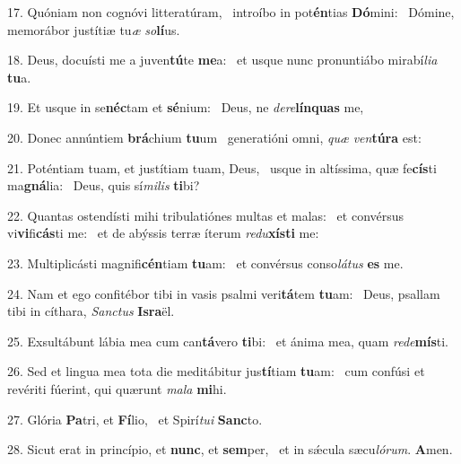 17. Quóniam non cognóvi litteratúram, \dag\  introíbo in pot\textbf{én}tias \textbf{Dó}mini: \ast\  Dómine, memorábor justítiæ tu\textit{æ} \textit{so}\textbf{lí}us.\

18. Deus, docuísti me a juven\textbf{tú}te \textbf{me}a: \ast\  et usque nunc pronuntiábo mirabí\textit{li}\textit{a} \textbf{tu}a.\

19. Et usque in se\textbf{néc}tam et \textbf{sé}nium: \ast\  Deus, ne \textit{de}\textit{re}\textbf{lín}\textbf{quas} me,\

20. Donec annúntiem \textbf{brá}chium \textbf{tu}um \ast\  generatióni omni, \textit{quæ} \textit{ven}\textbf{tú}\textbf{ra} est:\

21. Poténtiam tuam, et justítiam tuam, Deus, \dag\  usque in altíssima, quæ fe\textbf{cís}ti ma\textbf{gná}lia: \ast\  Deus, quis sí\textit{mi}\textit{lis} \textbf{ti}bi?\

22. Quantas ostendísti mihi tribulatiónes multas et malas: \dag\  et convérsus vi\textbf{vi}fi\textbf{cás}ti me: \ast\  et de abýssis terræ íterum \textit{re}\textit{du}\textbf{xís}\textbf{ti} me:\

23. Multiplicásti magnifi\textbf{cén}tiam \textbf{tu}am: \ast\  et convérsus conso\textit{lá}\textit{tus} \textbf{es} me.\

24. Nam et ego confitébor tibi in vasis psalmi veri\textbf{tá}tem \textbf{tu}am: \ast\  Deus, psallam tibi in cíthara, \textit{Sanc}\textit{tus} \textbf{Is}\textbf{ra}ël.\

25. Exsultábunt lábia mea cum can\textbf{tá}vero \textbf{ti}bi: \ast\  et ánima mea, quam \textit{red}\textit{e}\textbf{mís}ti.\

26. Sed et lingua mea tota die meditábitur jus\textbf{tí}tiam \textbf{tu}am: \ast\  cum confúsi et revériti fúerint, qui quærunt \textit{ma}\textit{la} \textbf{mi}hi.\

27. Glória \textbf{Pa}tri, et \textbf{Fí}lio, \ast\  et Spirí\textit{tu}\textit{i} \textbf{Sanc}to.\

28. Sicut erat in princípio, et \textbf{nunc}, et \textbf{sem}per, \ast\  et in sǽcula sæcu\textit{ló}\textit{rum}. \textbf{A}men.\

